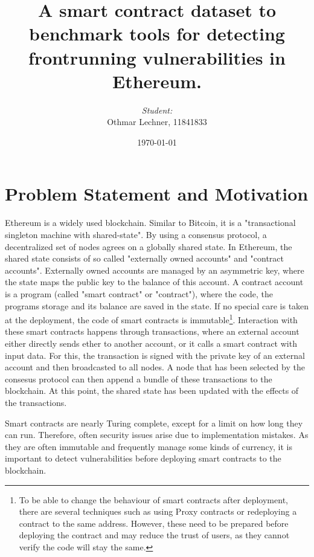 \documentclass[paper=a4,fontsize=11pt,oneside,titlepage]{scrartcl}
\title{A smart contract dataset to benchmark tools for detecting frontrunning vulnerabilities in Ethereum.}
\author{\textit{Student:}\\
Othmar Lechner, 11841833}
\date{\today}
\begin{document}
\thispagestyle{empty}
\maketitle
\newpage

\section{Problem Statement and Motivation}
\label{sec:problem}

Ethereum is a widely used blockchain. Similar to Bitcoin, it is a "transactional singleton machine with shared-state"\cite{wood_ethereum_2014}. By using a consensus protocol, a decentralized set of nodes agrees on a globally shared state. In Ethereum, the shared state consists of so called "externally owned accounts" and "contract accounts". Externally owned accounts are managed by an asymmetric key, where the state maps the public key to the balance of this account. A contract account is a program (called "smart contract" or "contract"), where the code, the programs storage and its balance are saved in the state\cite{tikhomirov_ethereum_2018}. If no special care is taken at the deployment, the code of smart contracts is immutable\footnote{To be able to change the behaviour of smart contracts after deployment, there are several techniques such as using Proxy contracts or redeploying a contract to the same address\cite{salehi_not_2022}. However, these need to be prepared before deploying the contract and may reduce the trust of users, as they cannot verify the code will stay the same.}\cite{salehi_not_2022}. Interaction with these smart contracts happens through transactions, where an external account either directly sends ether to another account, or it calls a smart contract with input data. For this, the transaction is signed with the private key of an external account and then broadcasted to all nodes. A node that has been selected by the consesus protocol can then append a bundle of these transactions to the blockchain. At this point, the shared state has been updated with the effects of the transactions\cite{tikhomirov_ethereum_2018}.

Smart contracts are nearly Turing complete, except for a limit on how long they can run\cite{tikhomirov_ethereum_2018}. Therefore, often security issues arise due to implementation mistakes. As they are often immutable and frequently manage some kinds of currency, it is important to detect vulnerabilities before deploying smart contracts to the blockchain.
\end{document}
